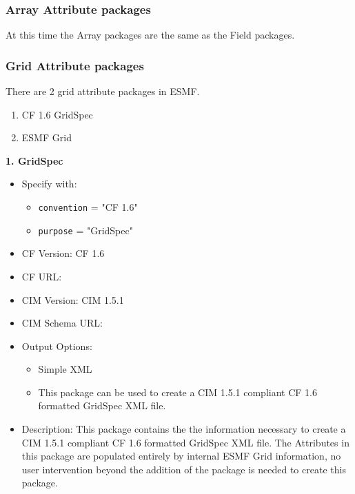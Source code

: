 \vspace{.20in}

\subsubsection{Array Attribute packages}
\label{ArrayAttributePackages}

At this time the Array packages are the same as the Field packages.

\vspace{.20in}

\subsubsection{Grid Attribute packages}
\label{GridAttributePackages}

There are 2 grid attribute packages in ESMF. 

\begin{enumerate}
    \item CF 1.6 GridSpec
    \item ESMF Grid
\end{enumerate}

\vspace{.20in}

{\bf 1. GridSpec}

\label{CIMGridAttributePackage}

\begin{itemize}
    \item Specify with:
    \begin{itemize}
        \item {\tt convention} = "CF 1.6"
        \item {\tt purpose} = "GridSpec"
    \end{itemize}
    \item CF Version: CF 1.6
    \item CF URL: 
    \item CIM Version: CIM 1.5.1
    \item CIM Schema URL: 
    \item Output Options:
    \begin{itemize}
        \item Simple XML
        \item This package can be used to create a CIM 1.5.1 compliant CF 1.6 formatted GridSpec XML file.
    \end{itemize}
    \item Description: This package contains the the information necessary to create a CIM 1.5.1 compliant CF 1.6 formatted GridSpec XML file.  The Attributes in this package are populated entirely by internal ESMF Grid information, no user intervention beyond the addition of the package is needed to create this package.
\end{itemize}

